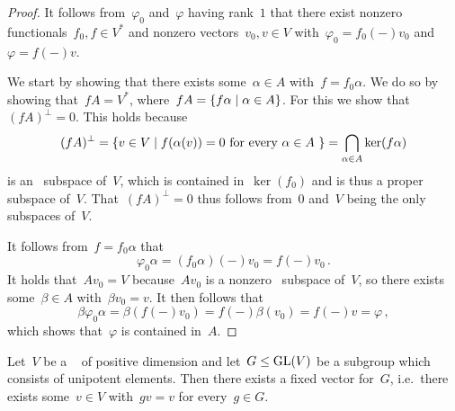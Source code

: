 \begin{proof}
  It follows from~$\varphi_0$ and~$\varphi$ having rank~$1$ that there exist nonzero functionals~$f_0, f \in V^*$ and nonzero vectors~$v_0, v \in V$ with~$\varphi_0 = f_0(-) v_0$ and~$\varphi = f(-) v$.
  
  We start by showing that there exists some~$\alpha \in A$ with~$f = f_0 \alpha$.
  We do so by showing that~$f A = V^*$, where~$f A = \{f \alpha \suchthat \alpha \in A\}$.
  For this we show that~$(f A)^\perp = 0$.
  This holds because
  \[
      (fA)^\perp
    = \{
        v \in V
      \suchthat
        \text{$f(\alpha(v)) = 0$ for every~$\alpha \in A$}\ 
      \}
    = \bigcap_{\alpha \in A} \ker(f \alpha)
  \]
  is an~ subspace of~$V$, which is contained in~$\ker(f_0)$ and is thus a proper~ subspace of~$V$.
  That~$(fA)^\perp = 0$ thus follows from~$0$ and~$V$ being the only~\dash{$A$}{invariant} subspaces of~$V$.
  
  It follows from~$f = f_0 \alpha$ that
  \[
      \varphi_0 \alpha
    = (f_0\alpha)(-) v_0
    = f(-) v_0 \,.
  \]
  It holds that~$A v_0 = V$ because~$A v_0$ is a nonzero~ subspace of~$V$, so there exists some~$\beta \in A$ with~$\beta v_0 = v$.
  It then follows that
  \[
      \beta \varphi_0 \alpha
    = \beta( f(-) v_0 )
    = f(-) \beta(v_0)
    = f(-) v
    = \varphi \,,
  \]
  which shows that~$\varphi$ is contained in~$A$.
\end{proof}


\begin{theorem}[Kolchin]
  \label{kolchin fixed vector}
  Let~$V$ be a {\fd}~{\kvs} of positive dimension and let~$G \leq \operatorname{GL}(V)$ be a subgroup which consists of unipotent elements.
  Then there exists a fixed vector for~$G$, i.e.\ there exists some~$v \in V$ with~$gv = v$ for every~$g \in G$.
\end{theorem}



